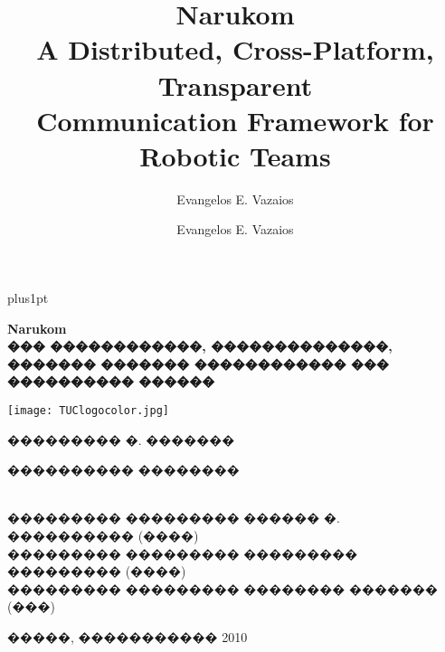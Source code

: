 \documentclass[report,12pt]{Classes/CUEDthesisPSnPDF}
\title{{\LARGE Narukom}\\A Distributed, Cross-Platform, Transparent\\Communication Framework for Robotic Teams}
\author{Evangelos E. Vazaios}
\author{Evangelos E. Vazaios}
\begin{document}
\en

 \renewcommand\baselinestretch{1.2}
\baselineskip=18pt plus1pt

%   





\maketitle
    \cleardoublepage
 {\gr
     \thispagestyle{empty}
  \begin{center}
    \setlength{\parskip}{0pt}
    {\large {} \par}
      \vspace*{1ex}
    {\large {} \par}
      \vspace*{20mm}
    { \Large {\bfseries {{\LARGE \en Narukom}\\��� ������������, ��������������, ������� ������� ������������ ��� ���������� ������}} \par}
	{\large \vspace*{10mm} {\texttt{[image: TUClogocolor.jpg]} \par} \vspace*{15mm}}	
    {{\Large ��������� �. �������} \par}
	\vspace*{15mm}
    {\large {\begin{normalsize}���������� ��������\end{normalsize}\\
��������� ��������� ������ �. ���������� (����)\\
��������� ��������� ��������� ��������� (����)\\
��������� ��������� �������� ������� (���)} \par}
	\vfill
    {\large �����, ����������� 2010}
  \end{center}
  \null\vfill
}
    \cleardoublepage
\end{document}
